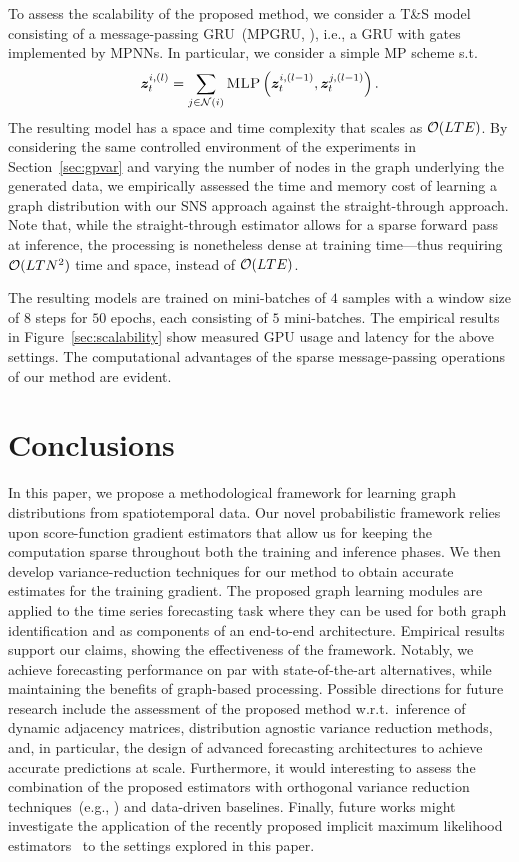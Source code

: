 To assess the scalability of the proposed method, we consider a T\&S model consisting of a message-passing GRU~(MPGRU, \citealt{cini2022filling}), i.e., a GRU with gates implemented by MPNNs. In particular, we consider a simple MP scheme s.t.
\begin{equation}
    {\bm{z}}_t^{i,(l)} = \sum_{j \in \mathcal{N}(i)}\textsc{MLP}\left({\bm{z}}_t^{i,(l-1)}, {\bm{z}}_t^{j,(l-1)}\right).
\end{equation}
The resulting model has a space and time complexity that scales as $\mathcal{O}(LTE)$. By considering the same controlled environment of the experiments in Section~\ref{sec:gpvar} and varying the number of nodes in the graph underlying the generated data, we empirically assessed the time and memory cost of learning a graph distribution with our SNS approach against the straight-through approach. Note that, while the straight-through estimator allows for a sparse forward pass at inference, the processing is nonetheless dense at training time---thus requiring $\mathcal{O}(LTN^2)$ time and space, instead of $\mathcal{O}(LTE)$.

The resulting models are trained on mini-batches of $4$ samples with a window size of $8$ steps for $50$ epochs, each consisting of $5$ mini-batches. The empirical results in Figure~\ref{sec:scalability} show measured GPU usage and latency for the above settings. The computational advantages of the sparse message-passing operations of our method are evident.


\section{Conclusions}\label{s:conclusion}
 
In this paper, we propose a methodological framework for learning graph distributions from spatiotemporal data. Our novel probabilistic framework relies upon score-function gradient estimators that allow us for keeping the computation sparse throughout both the training and inference phases. We then develop variance-reduction techniques for our method to obtain accurate estimates for the training gradient. 
The proposed graph learning modules are applied to the time series forecasting task where they can be used for both graph identification and as components of an end-to-end architecture.  
Empirical results support our claims, showing the effectiveness of the framework. Notably, we achieve forecasting performance on par with state-of-the-art alternatives, while maintaining the benefits of graph-based processing. 
Possible directions for future research include the assessment of the proposed method w.r.t.\ inference of dynamic adjacency matrices, distribution agnostic variance reduction methods, and, in particular, the design of advanced forecasting architectures to achieve accurate predictions at scale.  Furthermore, it would interesting to assess the combination of the proposed estimators with orthogonal variance reduction techniques~(e.g., \citealt{kool2020estimating}) and data-driven baselines. Finally, future works might investigate the application of the recently proposed implicit maximum likelihood estimators~\citep{niepert2021implicit, minervini2023adaptive} to the settings explored in this paper.

